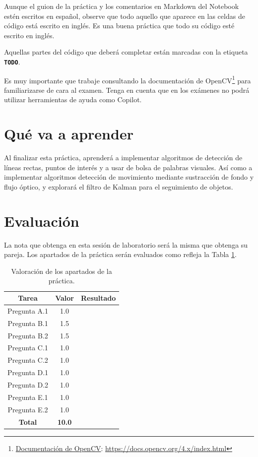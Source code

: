 Aunque el guion de la práctica y los comentarios en Markdown del Notebook estén escritos en español, observe que todo aquello que aparece en las celdas de código está escrito en inglés. Es una buena práctica que todo su código esté escrito en inglés.

Aquellas partes del código que deberá completar están marcadas con la etiqueta \textbf{\texttt{TODO}}.

Es muy importante que trabaje consultando la documentación de OpenCV\footnote{\href{https://docs.opencv.org/4.x/index.html}{Documentación de OpenCV}: \url{https://docs.opencv.org/4.x/index.html}} para familiarizarse de cara al examen. Tenga en cuenta que en los exámenes no podrá utilizar herramientas de ayuda como Copilot.

\section{Qué va a aprender}

Al finalizar esta práctica, aprenderá a implementar algoritmos de detección de líneas rectas, puntos de interés y a usar de bolsa de palabras visuales. Así como a implementar algoritmos detección de movimiento mediante sustracción de fondo y flujo óptico, y explorará el filtro de Kalman para el seguimiento de objetos.

\section{Evaluación}

La nota que obtenga en esta sesión de laboratorio será la misma que obtenga su pareja. Los apartados de la práctica serán evaluados como refleja la Tabla \ref{table:evaluacion}.

\begin{table}[h!]
    \centering
    \begin{tabular}{|c|c|c|}
    \hline
    \textbf{Tarea} & \textbf{Valor} & \textbf{Resultado} \\
    \hline
    Pregunta A.1 & 1.0 & \\
    \hline
    Pregunta B.1 & 1.5 & \\
    \hline
    Pregunta B.2 & 1.5 & \\
    \hline
    Pregunta C.1 & 1.0 & \\
    \hline
    Pregunta C.2 & 1.0 & \\
    \hline
    Pregunta D.1 & 1.0 & \\
    \hline
    Pregunta D.2 & 1.0 & \\
    \hline
    Pregunta E.1 & 1.0 & \\
    \hline
    Pregunta E.2 & 1.0 & \\
    \hline
    \textbf{Total} & \textbf{10.0} & \\
    \hline
    \end{tabular}
    \caption{Valoración de los apartados de la práctica.}
    \label{table:evaluacion}
\end{table}
